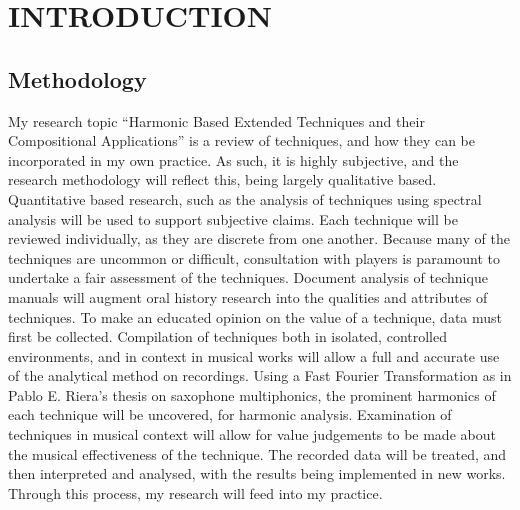 
\doublespace{}
\chapter[INTRODUCTION]{INTRODUCTION}

\section{Methodology}
My research topic “Harmonic Based Extended Techniques and their Compositional Applications” is a review of techniques, and how they can be incorporated in my own practice. As such, it is highly subjective, and the research methodology will reflect this, being largely qualitative based. Quantitative based research, such as the analysis of techniques using spectral analysis will be used to support subjective claims. Each technique will be reviewed individually, as they are discrete from one another. Because many of the techniques are uncommon or difficult, consultation with players is paramount to undertake a fair assessment of the techniques. Document analysis of technique manuals will augment oral history research into the qualities and attributes of techniques. 
To make an educated opinion on the value of a technique, data must first be collected. Compilation of techniques both in isolated, controlled environments, and in context in musical works will allow a full and accurate use of the analytical method on recordings. Using a Fast Fourier Transformation as in Pablo E. Riera’s thesis on saxophone multiphonics, the prominent harmonics of each technique will be uncovered, for harmonic analysis.\autocite{rieraComparativeStudySaxophone2014} Examination of techniques in musical context will allow for value judgements to be made about the musical effectiveness of the technique. The recorded data will be treated, and then interpreted and analysed, with the results being implemented in new works.\autocite{torresMultiphonicsCompositionalElement2012} Through this process, my research will feed into my practice.
